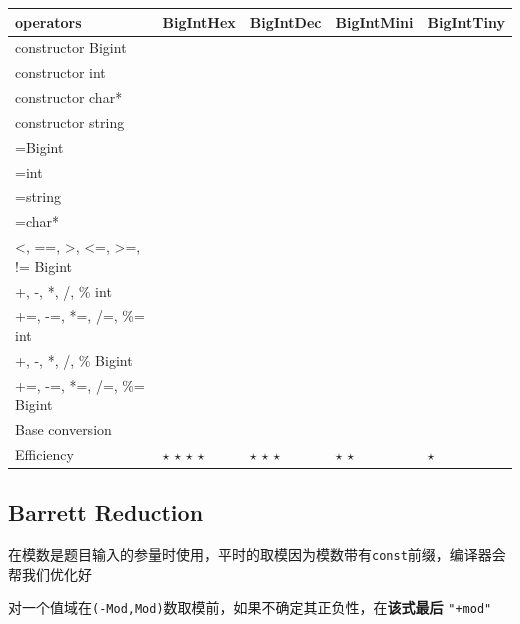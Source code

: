\documentclass[12pt]{article}
\newcommand{\cmark}{\text{\color{ForestGreen}\ding{51}}}%
\newcommand{\xmark}{\text{\color{red}\ding{55}}}%
\begin{document}
\begin{table}[!ht]
	\centering
	\begin{tabular}{|l|l|l|l|l|}
		\hline
		operators & BigIntHex & BigIntDec & BigIntMini & BigIntTiny \\ \hline
		constructor Bigint & \cmark & \cmark & \cmark & \cmark \\ \hline
		constructor int & \cmark & \cmark & \cmark & \cmark \\ \hline
		constructor char* & \cmark & \cmark & \xmark & \xmark \\ \hline
		constructor string & \cmark & \cmark & \cmark & \cmark \\ \hline
		=Bigint & \cmark & \cmark & \cmark & \cmark \\ \hline
		=int & \cmark & \cmark & \cmark & \cmark \\ \hline
		=string & \cmark & \cmark & \cmark & \cmark \\ \hline
		=char* & \cmark & \cmark & \cmark & \xmark \\ \hline
		<, ==, >, <=, >=, != Bigint & \cmark & \cmark & \cmark & \cmark \\ \hline
		+, -, *, /, \% int & \xmark & \xmark & \xmark & \cmark \\ \hline
		+=, -=, *=, /=, \%= int & \xmark & \xmark & \xmark & \xmark \\ \hline
		+, -, *, /, \% Bigint & \cmark & \cmark & \cmark & \cmark \\ \hline
		+=, -=, *=, /=, \%= Bigint & \cmark & \cmark & \xmark & \xmark \\ \hline
		Base conversion & \cmark & \cmark & \xmark & \xmark \\ \hline
		Efficiency & $\star$ $\star$ $\star$ $\star$ & $\star$ $\star$ $\star$ & $\star$ $\star$ & $\star$ \\ \hline
	\end{tabular}
\end{table}



\subsection{Barrett Reduction}

在模数是题目输入的参量时使用，平时的取模因为模数带有\texttt{const}前缀，编译器会帮我们优化好

对一个值域在\texttt{(-Mod,Mod)}数取模前，如果不确定其正负性，在\textbf{该式最后} \texttt{"+mod"}
\end{document}
